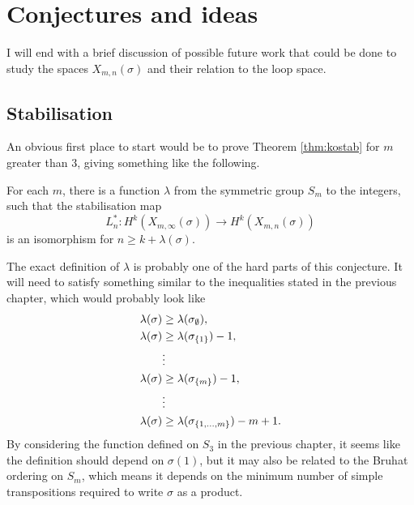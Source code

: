 

\chapter{Conjectures and ideas}
\label{chap:fremtid}

I will end with a brief discussion of possible future work that could
be done to study the spaces $X_{m,n}(\sigma)$ and their relation to
the loop space.

\section{Stabilisation}

An obvious first place to start would be to prove Theorem
\ref{thm:kostab} for $m$ greater than $3$, giving something like the
following.

\begin{conjecture}
  For each $m$, there is a function $\lambda$ from the symmetric
  group $S_m$ to the integers, such that the stabilisation map
  \[ L_n^* : H^k(X_{m,\infty}(\sigma)) \to H^k(X_{m,n}(\sigma)) \]
  is an isomorphism for $n \geq k + \lambda(\sigma)$.
\end{conjecture}

The exact definition of $\lambda$ is probably one of the hard parts of
this conjecture. It will need to satisfy something similar to the
inequalities stated in the previous chapter, which would probably look
like
\begin{align*}
  \lambda(\sigma) &\geq \lambda(\sigma_{\emptyset}), \\
  \lambda(\sigma) &\geq \lambda(\sigma_{\left\{ 1 \right\}}) - 1,\\
  &\vdots \\
  \lambda(\sigma) &\geq \lambda(\sigma_{\left\{ m \right\}}) - 1,\\
  &\vdots \\
  \lambda(\sigma) &\geq \lambda(\sigma_{\left\{ 1,\dots,m \right\}}) - m + 1.
\end{align*} 
By considering the function defined on $S_3$ in the previous chapter,
it seems like the definition should depend on $\sigma(1)$, but it may
also be related to the Bruhat ordering on $S_m$, which means it
depends on the minimum number of simple transpositions required to
write $\sigma$ as a product.

